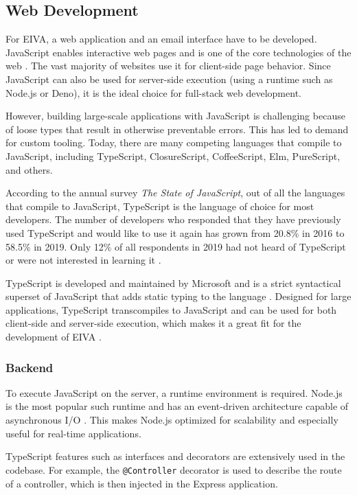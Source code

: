 \documentclass{article}
\begin{document}
\subsection{Web Development}

For EIVA, a web application and an email interface have to be developed. JavaScript enables interactive web pages and is one of the core technologies of the web \cite{flanagan_javascript:_2020}. The vast majority of websites use it for client-side page behavior. Since JavaScript can also be used for server-side execution (using a runtime such as Node.js or Deno), it is the ideal choice for full-stack web development.

However, building large-scale applications with JavaScript is challenging because of loose types that result in otherwise preventable errors. This has led to demand for custom tooling. Today, there are many competing languages that compile to JavaScript, including TypeScript, ClosureScript, CoffeeScript, Elm, PureScript, and others.

According to the annual survey \emph{The State of JavaScript}, out of all the languages that compile to JavaScript, TypeScript is the language of choice for most developers. The number of developers who responded that they have previously used TypeScript and would like to use it again has grown from 20.8\% in 2016 to 58.5\% in 2019. Only 12\% of all respondents in 2019 had not heard of TypeScript or were not interested in learning it \cite{noauthor_state_nodate}.

TypeScript is developed and maintained by Microsoft and is a strict syntactical superset of JavaScript that adds static typing to the language \cite{hutchison_understanding_2014}. Designed for large applications, TypeScript transcompiles to JavaScript and can be used for both client-side and server-side execution, which makes it a great fit for the development of EIVA \cite{huisman_inference_2017}.

\subsubsection{Backend}

To execute JavaScript on the server, a runtime environment is required. Node.js is the most popular such runtime and has an event-driven architecture capable of asynchronous I/O \cite{kaimer_return_2018}. This makes Node.js optimized for scalability and especially useful for real-time applications.

TypeScript features such as interfaces and decorators are extensively used in the codebase. For example, the \texttt{@Controller} decorator is used to describe the route of a controller, which is then injected in the Express application.
\end{document}
